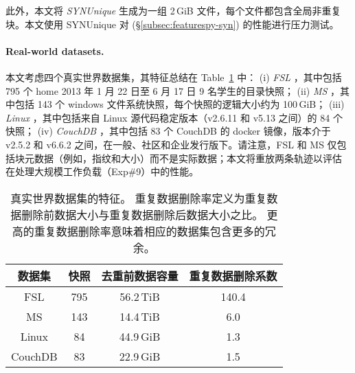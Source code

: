 此外，本文将 {\em SYNUnique} 生成为一组 2\,GiB 文件，每个文件都包含全局非重复块。本文使用 SYNUnique 对 \prototype (\S\ref{subsec:featurespy-syn}) 的性能进行压力测试。

\paragraph*{Real-world datasets.} 本文考虑四个真实世界数据集，其特征总结在 Table~\ref{tab:featurespy-datasets} 中： (i) {\em FSL} \cite{fsl}，其中包括 795 个 home 2013 年 1 月 22 日至 6 月 17 日 9 名学生的目录快照； (ii) {\em MS} \cite{meyer11}，其中包括 143 个 windows 文件系统快照，每个快照的逻辑大小约为 100\,GiB； (iii) {\em Linux} \cite{linux}，其中包括来自 Linux 源代码稳定版本（v2.6.11 和 v5.13 之间）的 84 个快照； (iv) {\em CouchDB} \cite{couchdb}，其中包括 83 个 CouchDB 的 docker 镜像，版本介于 v2.5.2 和 v6.6.2 之间，在一般、社区和企业发行版下。请注意，FSL 和 MS 仅包括块元数据（例如，指纹和大小）而不是实际数据；本文将重放两条轨迹以评估 \prototype 在处理大规模工作负载（Exp\#9）中的性能。

\begin{table}
  \centering
  \small
  \begin{tabular}{cccc}
    \toprule
    {\bf 数据集} & {\bf 快照} & {\bf 去重前数据容量} & {\bf 重复数据删除系数} \\
    \midrule
    FSL & 795 & 56.2\,TiB & 140.4 \\
    MS & 143 & 14.4\,TiB & 6.0 \\
    Linux & 84 & 44.9\,GiB & 1.3 \\
    CouchDB & 83 & 22.9\,GiB & 1.5 \\
    \bottomrule
  \end{tabular}
  \caption{真实世界数据集的特征。 重复数据删除率定义为重复数据删除前数据大小与重复数据删除后数据大小之比。 更高的重复数据删除率意味着相应的数据集包含更多的冗余。}
  \vspace{-6pt}
  \label{tab:featurespy-datasets}
\end{table}
